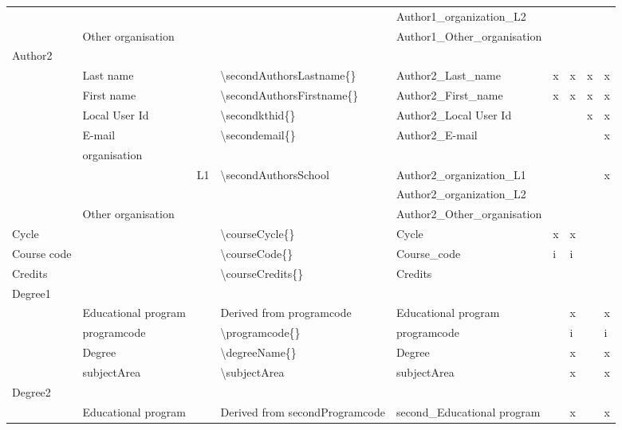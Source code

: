 \documentclass[12pt, twoside]{article}
\begin{document}
\begin{landscape}
{\begin{longtable}{L{2cm}|L{4cm}|l|L{4cm}|L{4cm}|l l l l|}
 &  &  &  & Author1\_organization\_L2 &  &  &  & \\
 & Other organisation &  &  & Author1\_Other\_organisation &  &  &  & \\
       \hline
{}Author2 & \\
 & Last name &  & \textbackslash secondAuthorsLastname\{\} & Author2\_Last\_name & x & x & x & x\\
 & First name &  & \textbackslash secondAuthorsFirstname\{\} & Author2\_First\_name & x & x & x & x\\
 & Local User Id &  & \textbackslash secondkthid\{\} & Author2\_Local User Id &  &  & x & x\\
 & E-mail &  & \textbackslash secondemail\{\} & Author2\_E-mail &  &  &  & x\\
 & organisation & \\ 
 &  & L1 & \textbackslash secondAuthorsSchool{ } & Author2\_organization\_L1 &  &  &  & x\\
 &  &  &  & Author2\_organization\_L2 &  &  &  & \\
 & Other organisation &  &  & Author2\_Other\_organisation &  &  &  & \\
       \hline
Cycle &  &  & \textbackslash courseCycle\{\} & Cycle & x & x &  & \\
Course code &  &  & \textbackslash courseCode\{\} & Course\_code & i & i &  &  \\
Credits &  &  & \textbackslash courseCredits\{\} & Credits &  &  &  & \\
      \hline
Degree1 & \\
 & Educational program &  & Derived from programcode & Educational program &  & x &  & x \\
 & programcode &  & \textbackslash programcode\{\} & programcode &  & i &  & i \\
 & Degree &  & \textbackslash degreeName\{\} & Degree &  & x &  & x \\
 & subjectArea &  & \textbackslash subjectArea{ } & subjectArea &  & x &  & x \\
Degree2 & \\
& Educational program &  & Derived from secondProgramcode & second\_Educational program &  & x &  & x \\

\end{longtable}}
\end{landscape}
\end{document}
